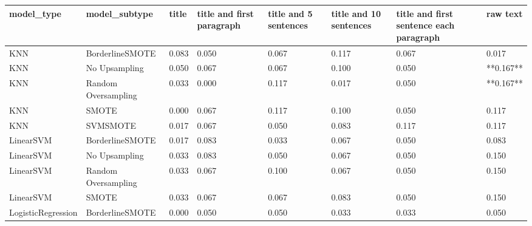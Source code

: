 \begin{tabular}{llllllll}
\toprule
                  model\_type &       model\_subtype & title & title and first paragraph & title and 5 sentences & title and 10 sentences & title and first sentence each paragraph &  raw text \\
\midrule
                         KNN &     BorderlineSMOTE & 0.083 &                     0.050 &                 0.067 &                  0.117 &                                   0.067 &     0.017 \\
                         KNN &       No Upsampling & 0.050 &                     0.067 &                 0.067 &                  0.100 &                                   0.050 & **0.167** \\
                         KNN & Random Oversampling & 0.033 &                     0.000 &                 0.117 &                  0.017 &                                   0.050 & **0.167** \\
                         KNN &               SMOTE & 0.000 &                     0.067 &                 0.117 &                  0.100 &                                   0.050 &     0.117 \\
                         KNN &            SVMSMOTE & 0.017 &                     0.067 &                 0.050 &                  0.083 &                                   0.117 &     0.117 \\
                   LinearSVM &     BorderlineSMOTE & 0.017 &                     0.083 &                 0.033 &                  0.067 &                                   0.050 &     0.083 \\
                   LinearSVM &       No Upsampling & 0.033 &                     0.083 &                 0.050 &                  0.067 &                                   0.050 &     0.150 \\
                   LinearSVM & Random Oversampling & 0.033 &                     0.067 &                 0.100 &                  0.067 &                                   0.050 &     0.150 \\
                   LinearSVM &               SMOTE & 0.033 &                     0.067 &                 0.067 &                  0.083 &                                   0.050 &     0.150 \\
          LogisticRegression &     BorderlineSMOTE & 0.000 &                     0.050 &                 0.050 &                  0.033 &                                   0.033 &     0.050 \\

\end{tabular}
